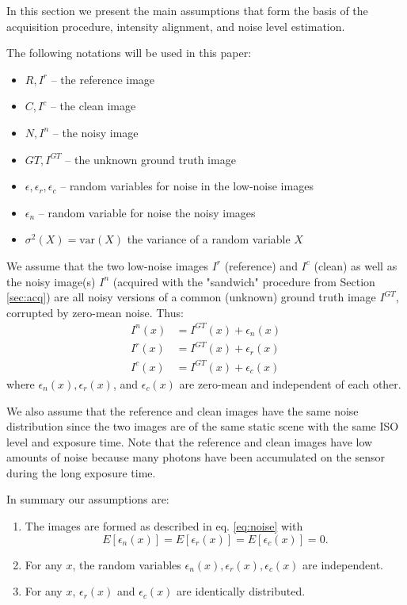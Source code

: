 \documentclass[review]{elsarticle}
\newcommand{\var}{\text{var}}
\begin{document}
In this section we present the main assumptions that form the basis of the acquisition procedure, intensity alignment, and noise level estimation.

The following notations will be used in this paper:
\begin{itemize}
\item $R,I^r$ -- the reference image
\item $C,I^c$ -- the clean image
\item  $N,I^n$ -- the noisy image
\item $GT,I^{GT}$ -- the unknown ground truth image
\item $\epsilon,\epsilon_r,\epsilon_c$ -- random variables for noise in the low-noise images
\item $\epsilon_n$ -- random variable for noise the noisy images
\item $\sigma^2(X)=\var(X)$ the variance of a random variable $X$
\end{itemize}
 We assume that the two low-noise images $I^r$ (reference)  and $I^c$ (clean) as well as the noisy image(s) $I^n$ (acquired with the "sandwich" procedure from Section \ref{sec:acq}) are all noisy versions of a common (unknown) ground truth image $I^{GT}$, corrupted by zero-mean noise. Thus:
\begin{equation}
\begin{split}
I^n(x)&=I^{GT}(x)+\epsilon_n(x)\\
I^r(x)&=I^{GT}(x)+\epsilon_r(x)\\
I^c(x)&=I^{GT}(x)+\epsilon_c(x) \label{eq:noise}
\end{split}
\end{equation}
where $\epsilon_n(x),\epsilon_r(x)$, and $\epsilon_c(x)$ are zero-mean and independent of each other.

 We also assume that the reference and clean images have the same noise distribution since the two images are of the same static scene with the same ISO level and exposure time. Note that the reference and clean images have low amounts of noise because many photons have been accumulated on the sensor during the long exposure time. 

 In summary our assumptions are:
 \begin{enumerate}
 \item The images are formed as described in eq. \eqref{eq:noise} with 
 \[E[\epsilon_n(x)]=E[\epsilon_r(x)]=E[\epsilon_c(x)]=0.\]
 \item  For any $x$, the random variables $\epsilon_n(x),\epsilon_r(x), \epsilon_c(x)$ are independent.
 \item For any $x$, $\epsilon_r(x)$ and $\epsilon_c(x)$ are identically distributed.
 \end{enumerate} 
 
\end{document}
